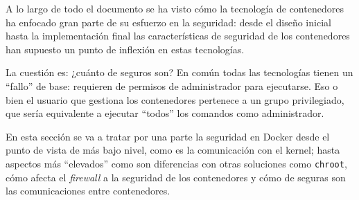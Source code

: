 A lo largo de todo el documento se ha visto cómo la tecnología de contenedores
ha enfocado gran parte de su esfuerzo en la seguridad: desde el diseño inicial
hasta la implementación final las características de seguridad de los 
contenedores han supuesto un punto de inflexión en estas tecnologías.

La cuestión es: ¿cuánto de seguros son? En común todas las tecnologías tienen
un ``fallo'' de base: requieren de permisos de administrador para ejecutarse.
Eso o bien el usuario que gestiona los contenedores pertenece a un grupo
privilegiado, que sería equivalente a ejecutar ``todos'' los comandos como
administrador.

En esta sección se va a tratar por una parte la seguridad en Docker desde el 
punto de vista de más bajo nivel, como es la comunicación con el kernel; hasta
aspectos más ``elevados'' como son diferencias con otras soluciones como
\texttt{chroot}, cómo afecta el \textit{firewall} a la seguridad de los
contenedores y cómo de seguras son las comunicaciones entre contenedores.